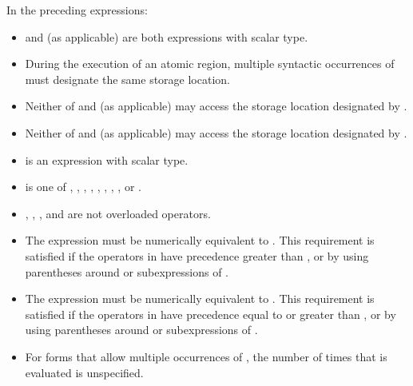 \begin{ccppspecific}
In the preceding expressions:

\begin{itemize}
\item {} and  (as applicable) are both  expressions with scalar type.

\item During the execution of an atomic region, multiple syntactic occurrences of  must 
designate the same storage location.

\item Neither of  and  (as applicable) may access the storage location designated by .

\item Neither of  and  (as applicable) may access the storage location designated by .

\item {} is an expression with scalar type. 

\item {} is one of \code{+}, \code{*}, \code{-}, \code{/}, 
\code{\&}, \code{\^}, \code{|}, \code{\textless \hspace{0.05em}\textless}, or 
\code{\textgreater \hspace{0.05em}\textgreater}.

\item {}, \code{=}, \code{++}, and \code{\--\--} are not overloaded operators.

\item The expression    must be numerically equivalent to 
  . This 
requirement is satisfied if the operators in  have precedence greater than , 
or by using parentheses around  or subexpressions of .

\item The expression    must be numerically equivalent to 
  . This 
requirement is satisfied if the operators in  have precedence equal to or greater 
than , or by using parentheses around  or subexpressions of .

\item For forms that allow multiple occurrences of , the number of times that  is 
evaluated is unspecified.
\end{itemize}

\end{ccppspecific}

